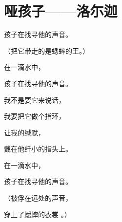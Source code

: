 
\section{哑孩子——洛尓迦}

孩子在找寻他的声音。

（把它带走的是蟋蟀的王。）

在一滴水中，

孩子在找寻他的声音。

我不是要它来说话，

我要把它做个指环，

让我的缄默，

戴在他纤小的指头上。

在一滴水中，

孩子在找寻他的声音。

（被俘在远处的声音，

穿上了蟋蟀的衣裳 。）